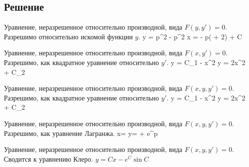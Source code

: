 \subsection{Решение}
\begin{enumerate}
    \solutionItemFirst
        {\equationFirst}
        {
        	Уравнение, неразрешенное относительно производной,
        	вида $ F(y, y') = 0 $. \\
        	Разрешимо относительно искомой функции $ y $.
        }
        {
        	\customCases
        		{y = p^2 - p^2 }
        		{x =  - p( + 2) + C}
        }

	\clearpage

    \solutionItemFirst
	    {\equationSecond}
	    {
	    	Уравнение, неразрешенное относительно производной,
	    	вида $ F(x, y') = 0 $. \\
	    	Разрешимо, как квадратное уравнение относительно $ y' $.
    	}
	    {
	    	\customCases
				{y = C_1 - x^2}
				{y = 2x^2 + C_2}
    	}

	\vspace{2em}

	\solutionItemFirst
		{\equationThird}
		{
			Уравнение, неразрешенное относительно производной,
			вида $ F(x, y, y') = 0 $. \\
			Разрешимо, как квадратное уравнение относительно $ y' $.
		}
		{
			\customCases
				{{y} = C_1 - x^2}
				{{y} = 2x^2 + C_2}
		}

	\vspace{2em}

	\solutionItemFirst
		{\equationFourth}
		{
			Уравнение, неразрешенное относительно производной,
			вида $ F(x, y, y') = 0 $. \\
			Разрешимо, как уравнение Лагранжа.
		}
		{
			\customCases
				{x=}	
				{y= + e^p}
		}

	\clearpage

	\solutionItemFirst
		{\equationFifth}
		{
			Уравнение, неразрешенное относительно производной,
			вида $ F(x, y, y') = 0 $. \\
			Сводится к уравнению Клеро.
		}
		{$ y=Cx-e^C\sin{C} $}

\end{enumerate} 
